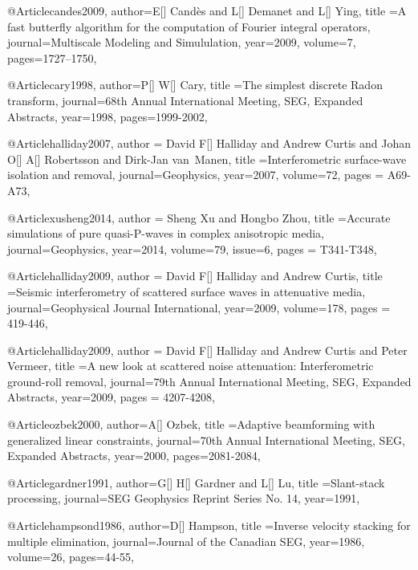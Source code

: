 @Article{candes2009,
  author={E[] Cand\`{e}s and L[] Demanet and L[] Ying},
  title ={A fast butterfly algorithm for the computation of Fourier integral operators},
  journal={Multiscale Modeling and Simululation},
  year=2009,
  volume=7,
  pages={1727–1750},
}

@Article{cary1998,
  author={P[] W[] Cary},
  title ={The simplest discrete Radon transform},
  journal={68th Annual International Meeting, SEG, Expanded Abstracts},
  year=1998,
  pages={1999-2002},
}




@Article{halliday2007,
  author = {David F[] Halliday and Andrew Curtis  and Johan O[] A[] Robertsson and Dirk-Jan van~Manen},
  title ={Interferometric surface-wave isolation and removal},
  journal={Geophysics},
  year=2007,
  volume={72},
  pages = {A69-A73},
}

@Article{xusheng2014,
  author = {Sheng Xu and Hongbo Zhou},
  title ={Accurate simulations of pure quasi-P-waves in complex anisotropic media},
  journal={Geophysics},
  year=2014,
  volume={79},
  issue=6,
  pages = {T341-T348},
}

@Article{halliday2009,
  author = {David F[] Halliday and Andrew Curtis},
  title ={Seismic interferometry of scattered surface waves in attenuative media},
  journal={Geophysical Journal International},
  year=2009,
  volume={178},
  pages = {419-446},
}





@Article{halliday2009,
  author = {David F[] Halliday and Andrew Curtis and Peter Vermeer},
  title ={A new look at scattered noise attenuation: Interferometric ground-roll removal},
  journal={79th Annual International Meeting, SEG, Expanded Abstracts},
  year=2009,
  pages = {4207-4208},
}

@Article{ozbek2000,
  author={A[] Ozbek},
  title ={Adaptive beamforming with generalized linear constraints},
  journal={70th Annual International Meeting, SEG, Expanded Abstracts},
  year=2000,
  pages={2081-2084},
}



@Article{gardner1991,
  author={G[] H[] Gardner and L[] Lu},
  title ={Slant-stack processing},
  journal={SEG Geophysics Reprint Series No. 14},
  year=1991,
}

@Article{hampsond1986,
  author={D[] Hampson},
  title ={Inverse velocity stacking for multiple elimination},
  journal={Journal of the Canadian SEG},
  year=1986,
  volume=26,
  pages={44-55},
}

